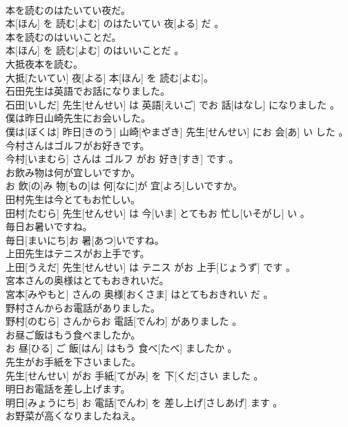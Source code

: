 \documentclass[8pt]{extreport}
\begin{document}
\begin{CJK}{UTF8}{min}
\\	本を読むのはたいてい夜だ。	
\\	本[ほん] を 読む[よむ] のはたいてい 夜[よる] だ 。
\\	本を読むのはいいことだ。	
\\	本[ほん] を 読む[よむ] のはいいことだ 。
\\	大抵夜本を読む。	
\\	大抵[たいてい] 夜[よる] 本[ほん] を 読む[よむ]。
\\	石田先生は英語でお話になりました。	
\\	石田[いしだ] 先生[せんせい] は 英語[えいご] でお 話[はなし] になりました 。
\\	僕は昨日山崎先生にお会いした。	
\\	僕は[ぼくは] 昨日[きのう] 山崎[やまざき] 先生[せんせい] にお 会[あ] い した 。
\\	今村さんはゴルフがお好きです。	
\\	今村[いまむら] さんは ゴルフ がお 好き[すき] です 。
\\	お飲み物は何が宜しいですか。	
\\	お 飲[の]み 物[もの]は 何[なに]が 宜[よろ]しいですか。
\\	田村先生は今とてもお忙しい。	
\\	田村[たむら] 先生[せんせい] は 今[いま] とてもお 忙し[いそがし] い 。
\\	毎日お暑いですね。	
\\	毎日[まいにち]お 暑[あつ]いですね。
\\	上田先生はテニスがお上手です。	
\\	上田[うえだ] 先生[せんせい] は テニス がお 上手[じょうず] です 。
\\	宮本さんの奥様はとてもおきれいだ。	
\\	宮本[みやもと] さんの 奥様[おくさま] はとてもおきれい だ 。
\\	野村さんからお電話がありました。	
\\	野村[のむら] さんからお 電話[でんわ] がありました 。
\\	お昼ご飯はもう食べましたか。	
\\	お 昼[ひる] ご 飯[はん] はもう 食べ[たべ] ましたか 。
\\	先生がお手紙を下さいました。	
\\	先生[せんせい] がお 手紙[てがみ] を 下[くだ]さい ました 。
\\	明日お電話を差し上げます。	
\\	明日[みょうにち] お 電話[でんわ] を 差し上げ[さしあげ] ます 。
\\	お野菜が高くなりましたねえ。	

\end{CJK}
\end{document}
